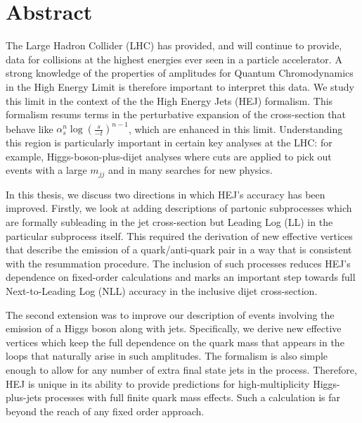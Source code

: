 \chapter{Abstract}

The Large Hadron Collider (LHC) has provided, and will continue to provide, data for collisions at the highest energies ever seen in a particle accelerator. A strong knowledge of the properties of amplitudes for Quantum Chromodynamics in the High Energy Limit is therefore important to interpret this data. We study this limit in the context of the the High Energy Jets (HEJ) formalism. This formalism resums terms in the perturbative expansion of the cross-section that behave like $\alpha_s^n \log(\frac{s}{-t})^{n-1}$, which are enhanced in this limit. Understanding this region is particularly important in certain key analyses at the LHC: for example, Higgs-boson-plus-dijet analyses where cuts are applied to pick out events with a large $m_{jj}$ and in many searches for new physics.

In this thesis, we discuss two directions in which HEJ's accuracy has been improved. Firstly, we look at adding descriptions of partonic subprocesses which are formally subleading in the jet cross-section but Leading Log (LL) in the particular subprocess itself. This required the derivation of new effective vertices that describe the emission of a quark/anti-quark pair in a way that is consistent with the resummation procedure. The inclusion of such processes reduces HEJ's dependence on fixed-order calculations and marks an important step towards full Next-to-Leading Log (NLL) accuracy in the inclusive dijet cross-section. 

The second extension was to improve our description of events involving the emission of a Higgs boson along with jets. Specifically, we derive new effective vertices which keep the full dependence on the quark mass that appears in the loops that naturally arise in such amplitudes. The formalism is also simple enough to allow for any number of extra final state jets in the process. Therefore, HEJ is unique in its ability to provide predictions for high-multiplicity Higgs-plus-jets processes with full finite quark mass effects. Such a calculation is far beyond the reach of any fixed order approach. 

